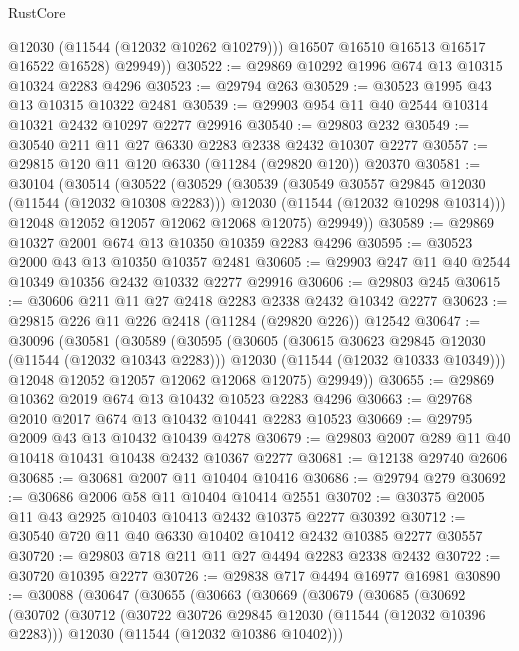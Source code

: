 \begin{lexlean}{RustCore}
\begin{coremodule}
            @12030
            (@11544 (@12032 @10262 @10279)))
          @16507
          @16510
          @16513
          @16517
          @16522
          @16528)
        @29949))
@30522 := @29869 @10292 @1996 @674 @13 @10315 @10324 @2283 @4296
@30523 := @29794 @263
@30529 := @30523 @1995 @43 @13 @10315 @10322 @2481
@30539 := @29903 @954 @11 @40 @2544 @10314 @10321 @2432 @10297 @2277 @29916
@30540 := @29803 @232
@30549 := @30540 @211 @11 @27 @6330 @2283 @2338 @2432 @10307 @2277
@30557 := @29815 @120 @11 @120 @6330 (@11284 (@29820 @120)) @20370
@30581 := @30104
    (@30514
      (@30522
        (@30529
          (@30539
            (@30549 @30557 @29845 @12030 (@11544 (@12032 @10308 @2283)))
            @12030
            (@11544 (@12032 @10298 @10314)))
          @12048
          @12052
          @12057
          @12062
          @12068
          @12075)
        @29949))
@30589 := @29869 @10327 @2001 @674 @13 @10350 @10359 @2283 @4296
@30595 := @30523 @2000 @43 @13 @10350 @10357 @2481
@30605 := @29903 @247 @11 @40 @2544 @10349 @10356 @2432 @10332 @2277 @29916
@30606 := @29803 @245
@30615 := @30606 @211 @11 @27 @2418 @2283 @2338 @2432 @10342 @2277
@30623 := @29815 @226 @11 @226 @2418 (@11284 (@29820 @226)) @12542
@30647 := @30096
    (@30581
      (@30589
        (@30595
          (@30605
            (@30615 @30623 @29845 @12030 (@11544 (@12032 @10343 @2283)))
            @12030
            (@11544 (@12032 @10333 @10349)))
          @12048
          @12052
          @12057
          @12062
          @12068
          @12075)
        @29949))
@30655 := @29869 @10362 @2019 @674 @13 @10432 @10523 @2283 @4296
@30663 := @29768 @2010 @2017 @674 @13 @10432 @10441 @2283 @10523
@30669 := @29795 @2009 @43 @13 @10432 @10439 @4278
@30679 := @29803 @2007 @289 @11 @40 @10418 @10431 @10438 @2432 @10367 @2277
@30681 := @12138 @29740 @2606
@30685 := @30681 @2007 @11 @10404 @10416
@30686 := @29794 @279
@30692 := @30686 @2006 @58 @11 @10404 @10414 @2551
@30702 := @30375 @2005 @11 @43 @2925 @10403 @10413 @2432 @10375 @2277 @30392
@30712 := @30540 @720 @11 @40 @6330 @10402 @10412 @2432 @10385 @2277 @30557
@30720 := @29803 @718 @211 @11 @27 @4494 @2283 @2338 @2432
@30722 := @30720 @10395 @2277
@30726 := @29838 @717 @4494 @16977 @16981
@30890 := @30088
    (@30647
      (@30655
        (@30663
          (@30669
            (@30679
              (@30685
                (@30692
                  (@30702
                    (@30712
                      (@30722 @30726 @29845 @12030 (@11544 (@12032 @10396 @2283)))
                      @12030
                      (@11544 (@12032 @10386 @10402)))

\end{coremodule}
\end{lexlean}
